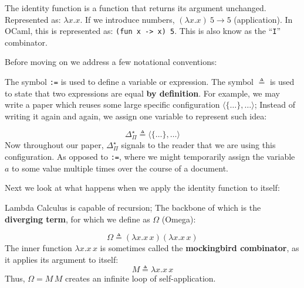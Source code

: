  \begin{Def}

    \label{def:identity-func}
    The identity function is a function that returns its argument unchanged. Represented as:
    $
    \lambda x. x
    $.
    \noindent
    If we introduce numbers,
    $
    (\lambda x. x)\ 5 \rightarrow 5
    $ (application).
    \noindent
    In OCaml, this is represented as: \texttt{(fun x -> x) 5}. This is also know as the ``\texttt{I}'' combinator.
  \end{Def}

  \newpage 

\noindent
Before moving on we address a few notational conventions:
\begin{Def}[Symbols $\triangleq$ vs. :=]

    The symbol \texttt{:=} is used to define a variable or expression.  
    The symbol $\triangleq$ is used to state that two expressions are equal \textbf{by definition}.
    For example, we may write a paper which reuses some large specific configuration $\langle\{\dots\}, \dots  \rangle$; Instead of 
    writing it again and again, we assign one variable to represent such idea:
    
    \Large
    \[
    \Delta^{\star}_{\Pi}   \triangleq \langle\{\dots\}, \dots  \rangle
    \]
    \normalsize
    Now throughout our paper, $\Delta^{\star}_{\Pi}$ signals to the reader that we are using this configuration.
    As opposed to \texttt{:=}, where we might temporarily assign the variable $a$ to some value multiple times over 
    the course of a document.
    \end{Def}
    
\noindent
Next we look at what happens when we apply the identity function to itself:

\begin{Def}

    Lambda Calculus is capable of recursion; The backbone of which is the \textbf{diverging term},
    for which we define as $\Omega$ (Omega):

    \Large
    \[
      \Omega\triangleq (\lambda x. x\,x)(\lambda x. x\,x)
    \]
    \normalsize
    \noindent    
    The inner function \(\lambda x. x\,x\) is sometimes called the \textbf{mockingbird combinator}, as it applies its argument to itself:
    \Large
    \[
      M \triangleq \lambda x. x\,x
    \]
    \normalsize
    Thus, \(\Omega = M\,M\) creates an infinite loop of self-application.
  \end{Def}

